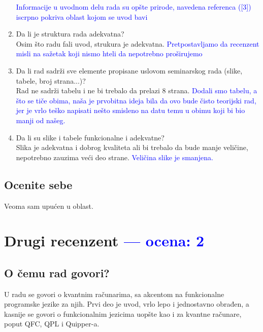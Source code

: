 \documentclass[a4paper]{report}
\newcommand{\odgovor}[1]{\textcolor{blue}{#1}}
\begin{document}
\begin{enumerate}
\odgovor{ Informacije u uvodnom delu rada su opšte prirode, navedena referenca ([3]) iscrpno pokriva oblast kojom se uvod bavi }
\item Da li je struktura rada adekvatna?\\
Osim što radu fali uvod, strukura je adekvatna.
\odgovor{Pretpostavljamo da recenzent misli na sažetak koji nismo hteli da nepotrebno proširujemo}
\item Da li rad sadrži sve elemente propisane uslovom seminarskog rada (slike, tabele, broj strana...)?\\
Rad ne sadrži tabelu i ne bi trebalo da prelazi 8 strana.
\odgovor {Dodali smo tabelu, a što se tiče obima, naša je prvobitna ideja bila da ovo bude čisto teorijski rad, jer je vrlo teško napisati nešto smisleno na datu temu u obimu koji bi bio manji od našeg.}
\item Da li su slike i tabele funkcionalne i adekvatne?\\
Slika je adekvatna i dobrog kvaliteta ali bi trebalo da bude manje veličine, nepotrebno zauzima veći deo strane.
\odgovor {Veličina slike je smanjena.}
\end{enumerate}

\section{Ocenite sebe}

Veoma sam upućen u oblast.

\chapter{Drugi recenzent \odgovor{--- ocena: 2} }

\section{O čemu rad govori?}
U radu se govori o kvantnim računarima, sa akcentom na funkcionalne programske jezike za njih. 
Prvi deo je uvod, vrlo lepo i jednostavno obrađen, a kasnije se govori o 
funkcionalnim jezicima uopšte kao i za kvantne računare, poput QFC, QPL i Quipper-a. 
\end{document}

